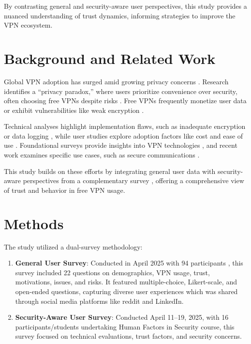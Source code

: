 \documentclass[11pt,a4paper]{article}
\begin{document}
By contrasting general and security-aware user perspectives, this study provides a nuanced understanding of trust dynamics, informing strategies to improve the VPN ecosystem.

\section{Background and Related Work}
Global VPN adoption has surged amid growing privacy concerns \citep{Dutkowska2022, Moore2024}. Research identifies a ``privacy paradox,'' where users prioritize convenience over security, often choosing free VPNs despite risks \citep{Story2021, Namara2020}. Free VPNs frequently monetize user data or exhibit vulnerabilities like weak encryption \citep{Khan2018, Wilson2020}.

Technical analyses highlight implementation flaws, such as inadequate encryption or data logging \citep{Abbas2023, Ramesh2022}, while user studies explore adoption factors like cost and ease of use \citep{Sombatruang2020, Blancaflor2024}. Foundational surveys provide insights into VPN technologies \citep{Erdogan2008, Khanvilkar2004}, and recent work examines specific use cases, such as secure communications \citep{Fassl2023, Singh2016}. 

This study builds on these efforts by integrating general user data with security-aware perspectives from a complementary survey \citep{Shetty2025}, offering a comprehensive view of trust and behavior in free VPN usage.

\section{Methods}
The study utilized a dual-survey methodology:

\begin{enumerate}
    \item \textbf{General User Survey}: Conducted in April 2025 with 94 participants , this survey included 22 questions on demographics, VPN usage, trust, motivations, issues, and risks. It featured multiple-choice, Likert-scale, and open-ended questions, capturing diverse user experiences which was shared through social media platforms like reddit and LinkedIn.
    \item \textbf{Security-Aware User Survey}: Conducted April 11--19, 2025, with 16 participants/students undertaking Human Factors in Security course, this survey focused on technical evaluations, trust factors, and security concerns\citep{Shetty2025}.
\end{enumerate}
\end{document}

